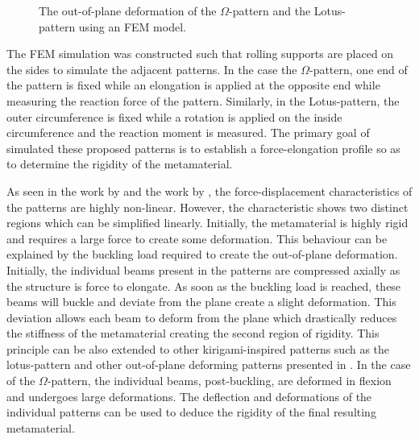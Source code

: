 \begin{figure}[hbt!]
    \centering
    \resizebox{0.48\textwidth}{!}{}
    \resizebox{0.48\textwidth}{!}{}
    \caption{The out-of-plane deformation of the $\Omega$-pattern and the Lotus-pattern using an FEM model.}
    \label{fig:kirigami-patterns-deformed}
\end{figure}

The FEM simulation was constructed such that rolling supports are placed on the sides to simulate the adjacent patterns. In the case the $\Omega$-pattern, one end of the pattern is fixed while an elongation is applied at the opposite end while measuring the reaction force of the pattern. Similarly, in the Lotus-pattern, the outer circumference is fixed while a rotation is applied on the inside circumference and the reaction moment is measured. The primary goal of simulated these proposed patterns is to establish a force-elongation profile so as to determine the rigidity of the metamaterial.


As seen in the work by \cite{shyuKirigamiApproachEngineering2015} and the work by \cite{firouzehDesignModelingNovel2015}, the force-displacement characteristics of the patterns are highly non-linear. However, the characteristic shows two distinct regions which can be simplified linearly. Initially, the metamaterial is highly rigid and requires a large force to create some deformation. This behaviour can be explained by the buckling load required to create the out-of-plane deformation. Initially, the individual beams present in the patterns are compressed axially as the structure is force to elongate. As soon as the buckling load is reached, these beams will buckle and deviate from the plane create a slight deformation. This deviation allows each beam to deform from the plane which drastically reduces the stiffness of the metamaterial creating the second region of rigidity. This principle can be also extended to other kirigami-inspired patterns such as the lotus-pattern and other out-of-plane deforming patterns presented in \cite{shyuKirigamiApproachEngineering2015}. In the case of the $\Omega$-pattern, the individual beams, post-buckling, are deformed in flexion and undergoes large deformations. The deflection and deformations of the individual patterns can be used to deduce the rigidity of the final resulting metamaterial.

